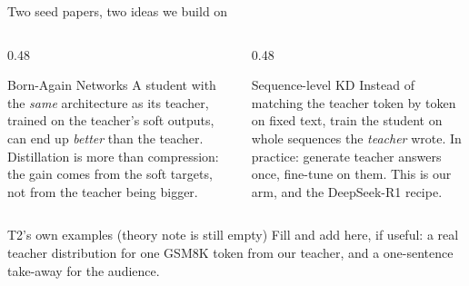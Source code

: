 \begin{frame}{Two seed papers, two ideas we build on\hfill\est\ }
  \begin{columns}[T]
    \begin{column}{0.48\textwidth}
      \begin{block}{Born-Again Networks }
        \footnotesize
        A student with the \emph{same} architecture as its teacher, trained
        on the teacher's soft outputs, can end up \emph{better} than the
        teacher. Distillation is more than compression: the gain comes from
        the soft targets, not from the teacher being bigger.
      \end{block}
    \end{column}
    \begin{column}{0.48\textwidth}
      \begin{block}{Sequence-level KD }
        \footnotesize
        Instead of matching the teacher token by token on fixed text, train
        the student on whole sequences the \emph{teacher} wrote. In practice:
        generate teacher answers once, fine-tune on them. This is our
         arm, and the DeepSeek-R1 recipe.
      \end{block}
    \end{column}
  \end{columns}
  \vspace{0.2cm}
  \begin{todobox}{T2's own examples (theory note is still empty)}
    Fill  and add here, if
    useful: a real teacher distribution for one GSM8K token from our
    teacher, and a one-sentence take-away for the audience.
  \end{todobox}
\end{frame}
